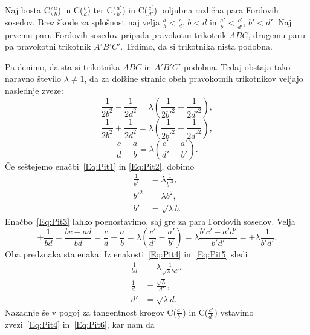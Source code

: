 \documentclass[mat1]{fmfdelo}
\begin{document}
\begin{dokaz}
%
Naj bosta C($\frac{a}{b}$) in C($\frac{c}{d}$) ter C($\frac{a'}{b'}$) in C($\frac{c'}{d'}$) poljubna različna para Fordovih sosedov. Brez škode za splošnost naj velja $\frac{a}{b}<\frac{c}{d}$, $b<d$ in $\frac{a'}{b'}<\frac{c'}{d'}$, $b'<d'$. Naj prvemu paru Fordovih sosedov pripada pravokotni trikotnik $ABC$, drugemu paru pa pravokotni trikotnik $A'B'C'$. Trdimo, da si trikotnika nista podobna.

Pa denimo, da sta si trikotnika $ABC$ in $A'B'C'$ podobna. Tedaj obstaja tako naravno število $\lambda\ne{1}$, da za dolžine stranic obeh pravokotnih trikotnikov veljajo naslednje zveze:
%
\begin{equation}
\label{Eq:Pit1}
\frac{1}{2b^2}-\frac{1}{2d^2} = \lambda \left (\frac{1}{2b'^2}-\frac{1}{2d'^2} \right ),
\end{equation}
%
\begin{equation}
\label{Eq:Pit2}
\frac{1}{2b^2}+\frac{1}{2d^2} = \lambda \left (\frac{1}{2b'^2}+\frac{1}{2d'^2} \right ),
\end{equation}
%
\begin{equation}
\label{Eq:Pit3}
\frac{c}{d}-\frac{a}{b} = \lambda \left (\frac{c'}{d'}-\frac{a'}{b'} \right ).
\end{equation}
%
Če seštejemo enačbi~\eqref{Eq:Pit1} in \eqref{Eq:Pit2}, dobimo
%
\begin{align}
\label{Eq:Pit4}
\frac{1}{b^2} &= \lambda \frac{1}{b'^2}, \nonumber \\
b'^2 &= \lambda b^2, \nonumber \\
b' &= \sqrt\lambda b.
\end{align}
%
Enačbo~\eqref{Eq:Pit3} lahko poenostavimo, saj gre za para Fordovih sosedov. Velja
\begin{equation}
\label{Eq:Pit5}
\pm \frac{1}{bd} = \frac{bc-ad}{bd} = \frac{c}{d}-\frac{a}{b} = \lambda \left (\frac{c'}{d'}-\frac{a'}{b'} \right ) = \lambda \frac{b'c'-a'd'}{b'd'} = \pm \lambda \frac{1}{b'd'}.
\end{equation}
%
Oba predznaka sta enaka. Iz enakosti~\eqref{Eq:Pit4} in~\eqref{Eq:Pit5} sledi 
%
\begin{align}
\label{Eq:Pit6}
\frac{1}{bd} &=\lambda \frac{1}{\sqrt\lambda bd'}, \nonumber \\
\frac{1}{d} &= \frac{\sqrt\lambda}{d'}, \nonumber \\
d' &= \sqrt\lambda d.
\end{align}
%
Nazadnje še v pogoj za tangentnost krogov C($\frac{a'}{b'}$) in C($\frac{c'}{d'}$) vstavimo zvezi~\eqref{Eq:Pit4} in~\eqref{Eq:Pit6}, kar nam da

\end{dokaz}
\end{document}
